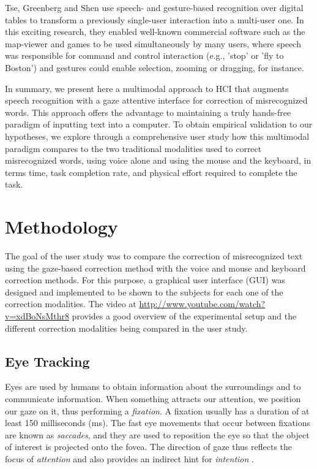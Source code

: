 \documentclass[]{article}
\begin{document}
Tse, Greenberg and Shen \cite{Tse2006} use speech- and gesture-based recognition over digital tables to transform a
previously single-user interaction into a multi-user one. In this exciting research, they enabled well-known commercial
software such as the map-viewer and games to be used simultaneously by many users, where speech was responsible for
command and control interaction (e.g., 'stop' or 'fly to Boston') and gestures could enable selection, zooming or
dragging, for instance.


In summary, we present here a multimodal approach to HCI that augments speech recognition with a gaze attentive
interface for correction of misrecognized words. This approach offers the advantage to maintaining a truly hands-free
paradigm of inputting text into a computer. To obtain empirical validation to our hypotheses, we explore through a
comprehensive user study how this multimodal paradigm compares to the two traditional modalities used to correct
misrecognized words, using voice alone and using the mouse and the keyboard, in terms time, task completion rate, and
physical effort required to complete the task.


\section{Methodology}
The goal of the user study was to compare the correction of misrecognized text using the gaze-based correction method with
the voice and mouse and keyboard correction methods. For this purpose, a graphical user interface (GUI)
was designed and implemented to be shown to the subjects for each one of the correction modalities. The video at
\url{http://www.youtube.com/watch?v=xdBoNsMthr8} provides a good overview of the experimental setup and the different
correction modalities being compared in the user study.


\subsection{Eye Tracking}
Eyes are used by humans to obtain information about the surroundings and to communicate information. When something
attracts our attention, we position our gaze on it, thus performing a \textit{fixation}. A fixation usually has a
duration of at least 150 milliseconds (ms). The fast eye movements that occur between fixations are known as
\textit{saccades}, and they are used to reposition the eye so that the object of interest is projected onto the fovea.
The direction of gaze thus reflects the focus of \textit{attention} and also provides an indirect hint for
\textit{intention} \cite{velichkovsky}.
\end{document}
